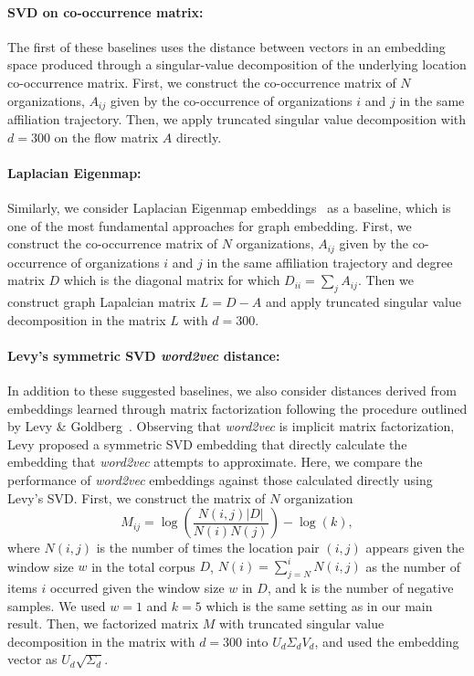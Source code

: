 \documentclass[12pt,draft,a4paper]{article}
\begin{document}
\vspace{-0.5cm}
\paragraph{SVD on co-occurrence matrix:}The first of these baselines uses the distance between vectors in an embedding space produced through a singular-value decomposition of the underlying location co-occurrence matrix. First, we construct the co-occurrence matrix of $N$ organizations, $A_{ij}$ given by the co-occurrence of organizations $i$ and $j$ in the same affiliation trajectory.
Then, we apply truncated singular value decomposition with $d=300$ on the flow matrix $A$ directly.

\vspace{-0.3cm}
\paragraph{Laplacian Eigenmap:} Similarly, we consider Laplacian Eigenmap embeddings~\autocite{belkin2003laplacian} as a baseline, which is one of the most fundamental approaches for graph embedding. First, we construct the co-occurrence matrix of $N$ organizations, $A_{ij}$ given by the co-occurrence of organizations $i$ and $j$ in the same affiliation trajectory and degree matrix $D$ which is the diagonal matrix for which $D_{ii}=\sum_j {A_{ij}}$. Then we construct graph Lapalcian matrix $L = D-A$  and apply truncated singular value decomposition in the matrix $L$ with $d=300$.

\vspace{-0.3cm}
\paragraph{Levy's  symmetric SVD \textit{word2vec} distance:} In addition to these suggested baselines, we also consider distances derived from embeddings learned through matrix factorization following the procedure outlined by Levy \& Goldberg~\autocite{levy2014neural}.
Observing that \textit{word2vec} is implicit matrix factorization, Levy proposed a symmetric SVD embedding that directly calculate the embedding that \textit{word2vec} attempts to approximate.
Here, we compare the performance of \textit{word2vec} embeddings against those calculated directly using Levy's SVD.
First, we construct the matrix of $N$ organization
\begin{equation}
	M_{ij} = \log\left(\frac{N(i,j) |D|}{N(i) N(j)}\right) - \log(k),
\end{equation}
where $N(i,j)$ is the number of times the location pair $(i,j)$ appears given the window size $w$ in the total corpus $D$, $N(i)=\sum_{j=N}^i N(i,j)$ as the number of items $i$ occurred given the window size $w$ in $D$, and k is the number of negative samples. We used $w=1$ and $k=5$ which is the same setting as in our main result. Then, we factorized matrix $M$ with truncated singular value decomposition in the matrix with $d=300$ into $U_d \Sigma_d V_d$, and used the embedding vector as $U_d\sqrt{\Sigma_d}$.
\end{document}
